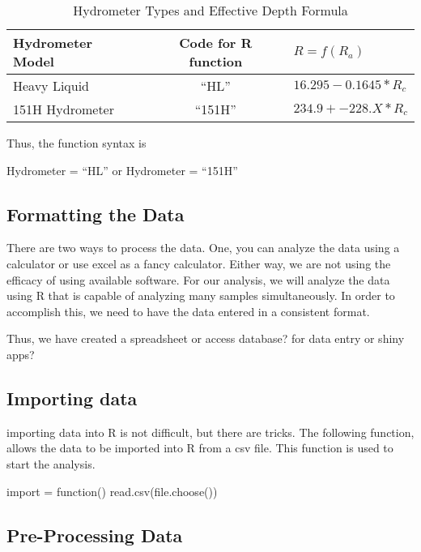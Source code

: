\begin{table}
		\begin{tabular}{lcl}\hline
Hydrometer Model	& Code for R function  	&	$R = f(R_a)$	\\ \hline\hline
Heavy Liquid			&		``HL''							&	$16.295 - 0.1645 * R_c$\\
151H Hydrometer		& 	``151H''						& $234.9 + -228.X * R_c$\\ \hline
		\end{tabular}
	\caption{Hydrometer Types and Effective Depth Formula}
	\label{tab:HydrometerTypesAndEffectiveDepthFormula}
\end{table}

Thus, the function syntax is

Hydrometer = ``HL'' or Hydrometer = ``151H''

\subsection{Formatting the Data}

There are two ways to process the data. One, you can analyze the data using a calculator or use excel as a fancy calculator. Either way, we are not using the efficacy of using available software. For our analysis, we will analyze the data using R that is capable of analyzing many samples simultaneously. In order to accomplish this, we need to have the data entered in a consistent format. 

Thus, we have created a spreadsheet or access database? for data entry or shiny apps?

\subsection{Importing data}

importing data into R is not difficult, but there are tricks. The following function, allows the data to be imported into R from a csv file. This function is used to start the analysis. 

\begin{Schunk}
\begin{Sinput}
 import = function(){
 read.csv(file.choose())
 }
\end{Sinput}
\end{Schunk}


\subsection{Pre-Processing Data}


